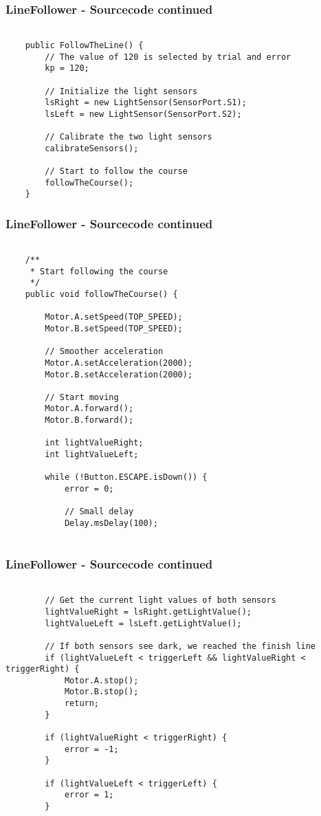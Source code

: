 \documentclass{beamer}
\begin{document}
\begin{frame}[fragile]
\frametitle{LineFollower - Sourcecode continued}
\begin{lstlisting}[firstnumber = 24]

	public FollowTheLine() {
		// The value of 120 is selected by trial and error
		kp = 120; 

		// Initialize the light sensors
		lsRight = new LightSensor(SensorPort.S1);
		lsLeft = new LightSensor(SensorPort.S2);

		// Calibrate the two light sensors
		calibrateSensors();

		// Start to follow the course
		followTheCourse();
	}

\end{lstlisting}
\end{frame}

\begin{frame}[fragile]
\frametitle{LineFollower - Sourcecode continued}
\begin{lstlisting}[firstnumber = 39]

	/**
	 * Start following the course
	 */
	public void followTheCourse() {

		Motor.A.setSpeed(TOP_SPEED);
		Motor.B.setSpeed(TOP_SPEED);

		// Smoother acceleration
		Motor.A.setAcceleration(2000);
		Motor.B.setAcceleration(2000);

		// Start moving
		Motor.A.forward();
		Motor.B.forward();

		int lightValueRight;
		int lightValueLeft;

		while (!Button.ESCAPE.isDown()) {
			error = 0;

			// Small delay
			Delay.msDelay(100); 
			
\end{lstlisting}
\end{frame}

\begin{frame}[fragile]
\frametitle{LineFollower - Sourcecode continued}
\begin{lstlisting}[firstnumber = 64]

		// Get the current light values of both sensors
		lightValueRight = lsRight.getLightValue();
		lightValueLeft = lsLeft.getLightValue();

		// If both sensors see dark, we reached the finish line
		if (lightValueLeft < triggerLeft && lightValueRight < triggerRight) {
			Motor.A.stop();
			Motor.B.stop();
			return;
		}
			
		if (lightValueRight < triggerRight) {
			error = -1;
		}

		if (lightValueLeft < triggerLeft) {
			error = 1;
		}
		
		\end{lstlisting}
\end{frame}
\end{document}
